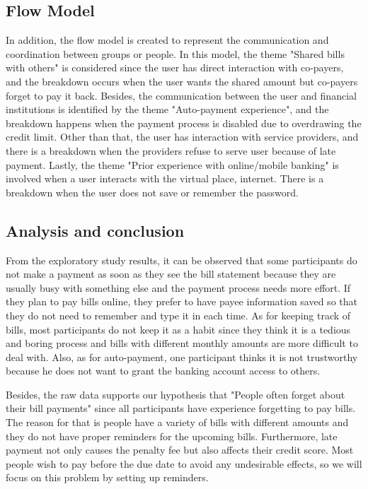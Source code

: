 \documentclass{sigchi}
\begin{document}
\subsection{Flow Model}

In addition, the flow model is created to represent the communication and coordination between groups or people. In this model, the theme "Shared bills with others" is considered since the user has direct interaction with co-payers, and the breakdown occurs when the user wants the shared amount but co-payers forget to pay it back. Besides, the communication between the user and financial institutions is identified by the theme "Auto-payment experience", and the breakdown happens when the payment process is disabled due to overdrawing the credit limit. Other than that, the user has interaction with service providers, and there is a breakdown when the providers refuse to serve user because of late payment. Lastly, the theme "Prior experience with online/mobile banking" is involved when a user interacts with the virtual place, internet. There is a breakdown when the user does not save or remember the password.


\subsection{Analysis and conclusion}

From the exploratory study results, it can be observed that some participants do not make a payment as soon as they see the bill statement because they are usually busy with something else and the payment process needs more effort. If they plan to pay bills online, they prefer to have payee information saved so that they do not need to remember and type it in each time. As for keeping track of bills, most participants do not keep it as a habit since they think it is a tedious and boring process and bills with different monthly amounts are more difficult to deal with. Also, as for auto-payment, one participant thinks it is not trustworthy because he does not want to grant the banking account access to others.
 
Besides, the raw data supports our hypothesis that "People often forget about their bill payments" since all participants have experience forgetting to pay bills. The reason for that is people have a variety of bills with different amounts and they do not have proper reminders for the upcoming bills. Furthermore, late payment not only causes the penalty fee but also affects their credit score. Most people wish to pay before the due date to avoid any undesirable effects, so we will focus on this problem by setting up reminders.
 
\end{document}
